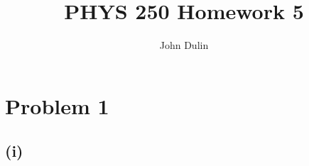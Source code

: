 \documentclass{article}
\author{John Dulin}
\title{PHYS 250 Homework 5}
\begin{document}
\maketitle

\section*{Problem 1}

\subsection*{(i)}
\end{document}
